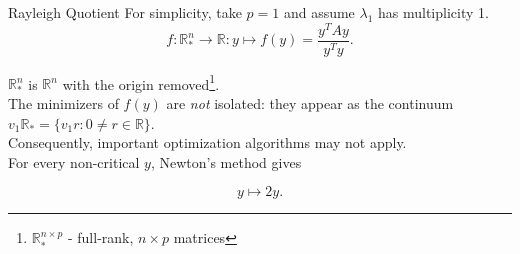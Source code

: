 \documentclass[xcolor=dvipsnames,t]{beamer} %
\newcommand{\reals}{\mathbb{R}}
\begin{document}
\begin{frame}{Rayleigh Quotient}
   For simplicity, take $p=1$ and assume $\lambda_1$ has multiplicity 1.\\

   \[ f: \reals^n_\ast \to \reals: y\mapsto f(y) = \dfrac{y^TAy}{y^Ty}. \] 

   \noindent $\reals^n_\ast$ is $\reals^n$ with the origin removed\footnote{$\reals_\ast^{n\times p}$ - full-rank, $n\times p$ matrices}.\\[.5em]
   
   
   \pause
   \noindent The minimizers of $f(y)$ are \emph{not} isolated: they appear as the continuum $v_1\reals_\ast = \{v_1r : 0\neq r\in\reals\}$.\\[.5em]

   \noindent Consequently, important optimization algorithms may not apply.\\[.5em]
   
   \noindent For every non-critical $y$, Newton's method gives

   \[ y\mapsto 2y. \] 

\end{frame}
\end{document}
